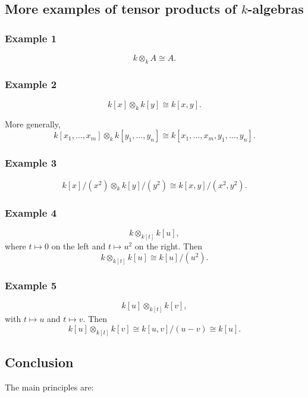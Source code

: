 \documentclass[12pt,a4paper]{article}
\theoremstyle{notespace}
\begin{document}
\subsection{More examples of tensor products of \(k\)-algebras}

\subsubsection*{Example 1}
\[
k\otimes_k A \cong A.
\]

\subsubsection*{Example 2}
\[
k[x]\otimes_k k[y]\cong k[x,y].
\]

More generally,
\[
k[x_1,\dots,x_m]\otimes_k k[y_1,\dots,y_n]
\cong
k[x_1,\dots,x_m,y_1,\dots,y_n].
\]

\subsubsection*{Example 3}
\[
k[x]/(x^2)\otimes_k k[y]/(y^2)
\cong
k[x,y]/(x^2,y^2).
\]

\subsubsection*{Example 4}
\[
k\otimes_{k[t]} k[u],
\]
where \(t\mapsto 0\) on the left and \(t\mapsto u^2\) on the right. Then
\[
k\otimes_{k[t]} k[u]\cong k[u]/(u^2).
\]

\subsubsection*{Example 5}
\[
k[u]\otimes_{k[t]} k[v],
\]
with \(t\mapsto u\) and \(t\mapsto v\). Then
\[
k[u]\otimes_{k[t]} k[v]\cong k[u,v]/(u-v)\cong k[u].
\]

\subsection{Conclusion}

The main principles are:
\end{document}
